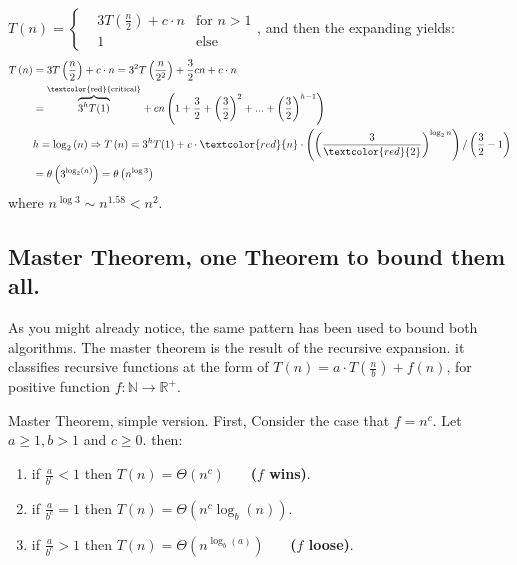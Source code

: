     \begin{example}\( T\left(n\right)  = \left\{ \begin{array}{rcl}
& 3T\left(\frac{n}{2}\right) + c\cdot n & \mbox{for }  n > 1  \\
& 1 & \mbox{else}  
\end{array}\right. \), and then the expanding yields: 
\begin{equation*}
    \begin{split}
        T\left(n\right) & = 3T\left(\frac{n}{2}\right) + c\cdot n = 3^2 T\left(\frac{n}{2^2}\right) + \frac{3}{2}cn + c\cdot n \\ 
        & =  \overset{\text{\textcolor{red}{critical}}}{\overbrace{3^{h}T(1)}} + cn\left(1 + \frac{3}{2} + \left(\frac{3}{2}\right)^2 + ...  + \left(\frac{3}{2}\right)^{h-1} \right) \\
        & h = \log_{2}\left(n\right) \Rightarrow T\left(n\right) = 3^{h}T(1) + c\cdot \textcolor{red}{n}\cdot \left(\left(\frac{3}{\textcolor{red}{2}}\right)^{\log_{2}{n}}\right) / \left(\frac{3}{2} - 1\right) \\ 
        & = \theta \left( 3^{\log_{2}(n)} \right) =  \theta \left( n^{\log 3} \right)  
    \end{split}
\end{equation*}
where \(n^{\log 3}  \sim n^{1.58} < n^2 \).
\end{example}


\subsection{Master Theorem, one Theorem to bound them all. }
As you might already notice, the same pattern has been used to bound both algorithms. The master theorem is the result of the recursive expansion. it classifies recursive functions at the form of \(T\left(n\right) = a\cdot T\left( \frac{n}{b} \right) + f\left(n\right) \), for positive function \(f : \mathbb{N} \rightarrow \mathbb{R}^{+} \).       

\begin{defbox}{Master Theorem, simple version.} First, Consider the case that \(f = n^c\). Let \( a \ge 1, b > 1\) and \( c \ge 0 \). then: 
\begin{enumerate}
    \item if \(\frac{a}{b^c} < 1 \) then \( T\left(n\right) = \Theta \left( n^c \right) \) \ \ \ \textbf{(\(f\) wins)}.
    \item if \(\frac{a}{b^c} = 1 \) then \( T\left(n\right) = \Theta \left( n^c \log_{b} \left(n\right) \right) \).
    \item if \(\frac{a}{b^c} > 1 \) then \( T\left(n\right) = \Theta \left( n^{\log_{b} \left(a\right)} \right) \) \ \ \ \textbf{(\(f\) loose)}.
  \end{enumerate}
\end{defbox}

